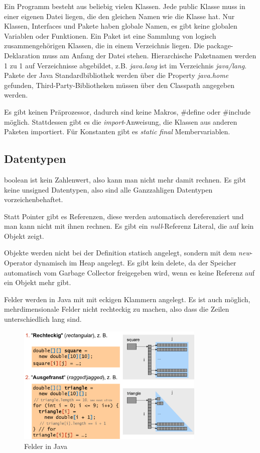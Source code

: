 \documentclass[12pt]{scrartcl}
\begin{document}
Ein Programm besteht aus beliebig vielen Klassen. Jede public Klasse muss in einer eigenen Datei liegen, die den gleichen Namen wie die Klasse hat.
Nur Klassen, Interfaces und Pakete haben globale Namen, es gibt keine globalen Variablen oder Funktionen.
Ein Paket ist eine Sammlung von logisch zusammengehörigen Klassen, die in einem Verzeichnis liegen. Die package-Deklaration muss am Anfang der Datei stehen.
Hierarchische Paketnamen werden 1 zu 1 auf Verzeichnisse abgebildet, z.B. \emph{java.lang} ist im Verzeichnis \emph{java/lang}.
Pakete der Java Standardbibliothek werden über die Property  \emph{java.home} gefunden,
Third-Party-Bibliotheken müssen über den Classpath angegeben werden.
\linebreak

Es gibt keinen Präprozessor, dadurch sind keine Makros, \#define oder \#include möglich.
Stattdessen gibt es die \emph{import}-Anweisung, die Klassen aus anderen Paketen importiert.
Für Konstanten gibt es \emph{static final} Membervariablen.

\subsection{Datentypen}

boolean ist kein Zahlenwert, also kann man nicht mehr damit rechnen. Es gibt keine unsigned Datentypen,
also sind alle Ganzzahligen Datentypen vorzeichenbehaftet.
\linebreak

Statt Pointer gibt es Referenzen, diese werden automatisch dereferenziert und man kann
nicht mit ihnen rechnen. Es gibt ein \emph{null}-Referenz Literal, die auf kein Objekt zeigt.

Objekte werden nicht bei der Definition statisch angelegt, sondern mit dem
\emph{new}-Operator dynamisch im Heap angelegt. Es gibt kein delete, da der Speicher
automatisch vom Garbage Collector freigegeben wird, wenn es keine Referenz auf ein Objekt mehr gibt.
\linebreak

Felder werden in Java mit mit eckigen Klammern angelegt. Es ist auch möglich, mehrdimensionale
Felder nicht rechteckig zu machen, also dass die Zeilen unterschiedlich lang sind.

\begin{figure}[H]
	\centering
	\includegraphics[width=0.8\textwidth]{images/java_1.png}
	\caption{Felder in Java}
\end{figure}
\end{document}
